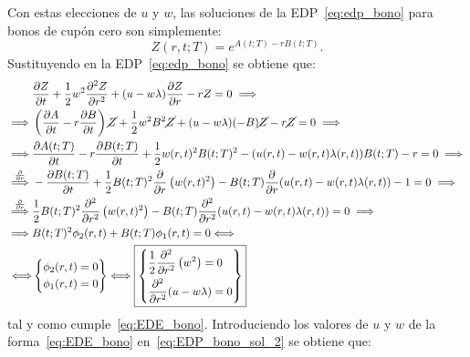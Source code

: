 Con estas elecciones de $u$ y $w$, las soluciones de la EDP~\eqref{eq:edp_bono} para bonos de cupón cero son simplemente:
\begin{equation*}
    Z(r, t; T) = e^{A(t;T) - r B(t;T)}.
\end{equation*}
Sustituyendo en la EDP~\eqref{eq:edp_bono} se obtiene que:
\begin{align}
    &\frac{\partial Z}{\partial t} + \frac{1}{2} w^2 \frac{\partial^2 Z}{\partial r^2} + (u - w\lambda) \frac{\partial Z}{\partial r} - rZ = 0 \implies \nonumber\\
    \implies &\left( \frac{\partial A}{\partial t} - r \frac{\partial B}{\partial t}  \right) \cancel{Z} + \frac{1}{2} w^2 B^2 \cancel{Z} + (u - w\lambda) (-B) \cancel{Z} - r \cancel{Z} = 0 \implies \nonumber\\
    \implies &\frac{\partial A(t;T)}{\partial t} - r \frac{\partial B(t;T)}{\partial t} + \frac{1}{2} w(r,t)^2 B(t;T)^2 - (u(r,t) - w(r,t)\lambda(r,t)) B(t;T) - r = 0 \label{eq:EDP_bono_sol_1}\implies \\
    \overset{\frac{\partial}{\partial r}}{\implies} &-\frac{\partial B(t;T)}{\partial t} + \frac{1}{2} B(t;T)^2 \frac{\partial}{\partial r}\left(w(r,t)^2\right) - B(t;T) \frac{\partial}{\partial r} (u(r,t) - w(r,t)\lambda(r,t)) - 1 = 0 \label{eq:EDP_bono_sol_2} \implies\\
    \overset{\frac{\partial}{\partial r}}{\implies} &\frac{1}{2} B(t;T)^2 \frac{\partial^2}{\partial r^2}\left(w(r,t)^2\right) - B(t;T) \frac{\partial^2}{\partial r^2} (u(r,t) - w(r,t)\lambda(r,t)) = 0 \implies \nonumber\\
    \implies &B(t;T)^2 \phi_2(r,t) + B(t;T) \phi_1(r,t) = 0 \Longleftrightarrow \nonumber\\
    \Longleftrightarrow 
    &\left\{
        \begin{aligned}
            &\phi_2(r,t) = 0 \\
            &\phi_1(r,t) = 0
        \end{aligned}
    \right\} \Longleftrightarrow 
    \boxed{
        \left\{
        \begin{aligned}
            &\frac{1}{2} \frac{\partial^2}{\partial r^2}\left(w^2\right) = 0 \\
            &\frac{\partial^2}{\partial r^2} (u - w\lambda) = 0
        \end{aligned}
        \right\}
    } \nonumber\\
\end{align}
tal y como cumple~\eqref{eq:EDE_bono}. Introduciendo los valores de $u$ y $w$ de la forma~\eqref{eq:EDE_bono} en~\eqref{eq:EDP_bono_sol_2} se obtiene que:
